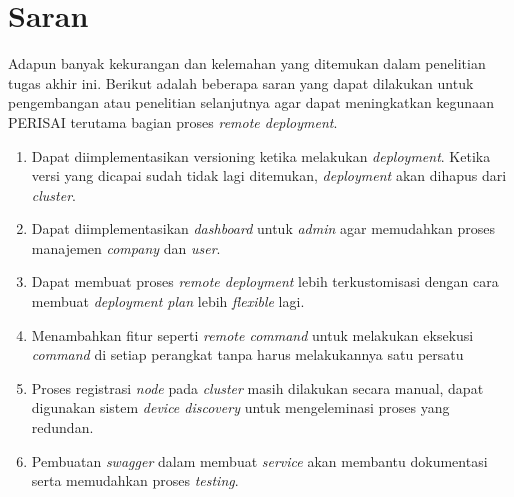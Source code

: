 \section{Saran}
Adapun banyak kekurangan dan kelemahan yang ditemukan dalam penelitian tugas akhir ini. Berikut adalah beberapa saran yang dapat dilakukan untuk pengembangan atau penelitian selanjutnya agar dapat meningkatkan kegunaan PERISAI terutama bagian proses \textit{remote deployment}.
\begin{enumerate}
  \item Dapat diimplementasikan versioning ketika melakukan \textit{deployment}. Ketika versi yang dicapai sudah tidak lagi ditemukan, \textit{deployment} akan dihapus dari \textit{cluster}.
  \item Dapat diimplementasikan	\textit{dashboard} untuk \textit{admin} agar memudahkan proses manajemen \textit{company} dan \textit{user}.
  \item Dapat membuat proses \textit{remote deployment} lebih terkustomisasi dengan cara membuat \textit{deployment plan} lebih \textit{flexible} lagi.
  \item Menambahkan fitur seperti \textit{remote command} untuk melakukan eksekusi \textit{command} di setiap perangkat tanpa harus melakukannya satu persatu
  \item Proses registrasi \textit{node} pada \textit{cluster} masih dilakukan secara manual, dapat digunakan sistem \textit{device discovery} untuk mengeleminasi proses yang redundan.
  \item Pembuatan \textit{swagger} dalam membuat \textit{service} akan membantu dokumentasi serta memudahkan proses \textit{testing}.
\end{enumerate}
